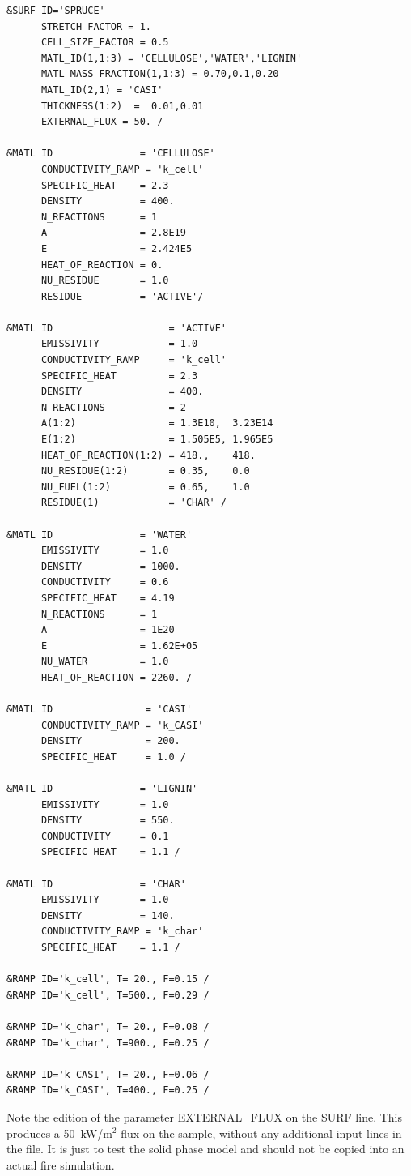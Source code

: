\documentclass[11pt]{book}
\begin{document}
\scriptsize
\begin{verbatim}
&SURF ID='SPRUCE'
      STRETCH_FACTOR = 1.
      CELL_SIZE_FACTOR = 0.5
      MATL_ID(1,1:3) = 'CELLULOSE','WATER','LIGNIN'
      MATL_MASS_FRACTION(1,1:3) = 0.70,0.1,0.20
      MATL_ID(2,1) = 'CASI'
      THICKNESS(1:2)  =  0.01,0.01
      EXTERNAL_FLUX = 50. /

&MATL ID               = 'CELLULOSE'
      CONDUCTIVITY_RAMP = 'k_cell'
      SPECIFIC_HEAT    = 2.3
      DENSITY          = 400.
      N_REACTIONS      = 1
      A                = 2.8E19
      E                = 2.424E5
      HEAT_OF_REACTION = 0.
      NU_RESIDUE       = 1.0
      RESIDUE          = 'ACTIVE'/

&MATL ID                    = 'ACTIVE'
      EMISSIVITY            = 1.0
      CONDUCTIVITY_RAMP     = 'k_cell'
      SPECIFIC_HEAT         = 2.3
      DENSITY               = 400.
      N_REACTIONS           = 2
      A(1:2)                = 1.3E10,  3.23E14
      E(1:2)                = 1.505E5, 1.965E5
      HEAT_OF_REACTION(1:2) = 418.,    418.
      NU_RESIDUE(1:2)       = 0.35,    0.0
      NU_FUEL(1:2)          = 0.65,    1.0
      RESIDUE(1)            = 'CHAR' /

&MATL ID               = 'WATER'
      EMISSIVITY       = 1.0
      DENSITY          = 1000.
      CONDUCTIVITY     = 0.6
      SPECIFIC_HEAT    = 4.19
      N_REACTIONS      = 1
      A                = 1E20
      E                = 1.62E+05
      NU_WATER         = 1.0
      HEAT_OF_REACTION = 2260. /

&MATL ID                = 'CASI'
      CONDUCTIVITY_RAMP = 'k_CASI'
      DENSITY           = 200.
      SPECIFIC_HEAT     = 1.0 /

&MATL ID               = 'LIGNIN'
      EMISSIVITY       = 1.0
      DENSITY          = 550.
      CONDUCTIVITY     = 0.1
      SPECIFIC_HEAT    = 1.1 /

&MATL ID               = 'CHAR'
      EMISSIVITY       = 1.0
      DENSITY          = 140.
      CONDUCTIVITY_RAMP = 'k_char'
      SPECIFIC_HEAT    = 1.1 /

&RAMP ID='k_cell', T= 20., F=0.15 /
&RAMP ID='k_cell', T=500., F=0.29 /

&RAMP ID='k_char', T= 20., F=0.08 /
&RAMP ID='k_char', T=900., F=0.25 /

&RAMP ID='k_CASI', T= 20., F=0.06 /
&RAMP ID='k_CASI', T=400., F=0.25 /
\end{verbatim} \normalsize

\noindent
Note the edition of the parameter {\ct EXTERNAL\_FLUX} on the {\ct SURF} line. This produces a 50~kW/m$^2$ flux on the sample, without any
additional input lines in the file. It is just to test the solid phase model and should not be copied into an actual fire simulation.
\end{document}
